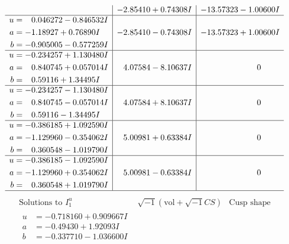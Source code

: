 \documentclass[1p]{elsarticle_modified}
\theoremstyle{definition}
\newcommand{\I}{\sqrt{-1}}
\begin{document}
$$\begin{array}{c|c|c}
 & -2.85410 + 0.74308 I & -13.57323 - 1.00600 I \\ \hline\begin{aligned}
u &= \phantom{-}0.046272 - 0.846532 I \\
a &= -1.18927 + 0.76890 I \\
b &= -0.905005 - 0.577259 I\end{aligned}
 & -2.85410 - 0.74308 I & -13.57323 + 1.00600 I \\ \hline\begin{aligned}
u &= -0.234257 + 1.130480 I \\
a &= \phantom{-}0.840745 + 0.057014 I \\
b &= \phantom{-}0.59116 + 1.34495 I\end{aligned}
 & \phantom{-}4.07584 - 8.10637 I & \phantom{-0.000000 } 0 \\ \hline\begin{aligned}
u &= -0.234257 - 1.130480 I \\
a &= \phantom{-}0.840745 - 0.057014 I \\
b &= \phantom{-}0.59116 - 1.34495 I\end{aligned}
 & \phantom{-}4.07584 + 8.10637 I & \phantom{-0.000000 } 0 \\ \hline\begin{aligned}
u &= -0.386185 + 1.092590 I \\
a &= -1.129960 - 0.354062 I \\
b &= \phantom{-}0.360548 - 1.019790 I\end{aligned}
 & \phantom{-}5.00981 + 0.63384 I & \phantom{-0.000000 } 0 \\ \hline\begin{aligned}
u &= -0.386185 - 1.092590 I \\
a &= -1.129960 + 0.354062 I \\
b &= \phantom{-}0.360548 + 1.019790 I\end{aligned}
 & \phantom{-}5.00981 - 0.63384 I & \phantom{-0.000000 } 0\\
 \hline 
 \end{array}$$\newpage$$\begin{array}{c|c|c}  
\text{Solutions to }I^u_{1}& \I (\text{vol} + \sqrt{-1}CS) & \text{Cusp shape}\\
 \hline 
\begin{aligned}
u &= -0.718160 + 0.909667 I \\
a &= -0.49430 + 1.92093 I \\
b &= -0.337710 - 1.036600 I\end{aligned}

\end{array}$$
\end{document}

